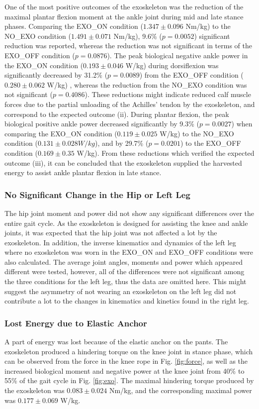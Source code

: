 \documentclass[10pt]{asme2ej}
\begin{document}
One of the most positive outcomes of the exoskeleton was the reduction of the maximal plantar flexion moment at the ankle joint during mid and late stance phases.
Comparing the EXO\_ON condition ($1.347\pm0.096$ Nm/kg) to the NO\_EXO condition ($1.491\pm0.071$ Nm/kg), 9.6\% ($p = 0.0052$) significant reduction was reported, whereas the reduction was not significant in terms of the EXO\_OFF  condition ($p = 0.0876$).
The peak biological negative ankle power in the EXO\_ON condition ($0.193\pm0.046$ W/kg) during dorsiflexion was significantly decreased by 31.2\% ($p = 0.0089$) from the EXO\_OFF condition ($0.280\pm0.062$ W/kg) , whereas the reduction from the NO\_EXO condition was not significant ($p = 0.4086$).
These reductions might indicate reduced calf muscle forces due to the partial unloading of the Achilles’ tendon by the exoskeleton, and correspond to the expected outcome (ii).
During plantar flexion, the peak biological positive ankle power decreased significantly by 9.3\% ($p = 0.0027$) when comparing the EXO\_ON condition ($0.119\pm0.025$ W/kg) to the NO\_EXO condition ($0.131\pm0.028 W/kg$), and by 29.7\% ($p = 0.0201$) to the EXO\_OFF condition ($0.169\pm0.35$ W/kg).
From these reductions which verified the expected outcome (iii), it can be concluded that the exoskeleton supplied the harvested energy to assist ankle plantar flexion in late stance.

\subsubsection{No Significant Change in the Hip or Left Leg}
The hip joint moment and power did not show any significant differences over the entire gait cycle.
As the exoskeleton is designed for assisting the knee and ankle joints, it was expected that the hip joint was not affected a lot by the exoskeleton.
In addition, the inverse kinematics and dynamics of the left leg where no exoskeleton was worn in the EXO\_ON and EXO\_OFF conditions were also calculated.
The average joint angles, moments and power which appeared different were tested, however, all of the differences were not significant among the three conditions for the left leg, thus the data are omitted here.
This might suggest the asymmetry of not wearing an exoskeleton on the left leg did not contribute a lot to the changes in kinematics and kinetics found in the right leg.

\subsubsection{Lost Energy due to Elastic Anchor}
A part of energy was lost because of the elastic anchor on the pants.
The exoskeleton produced a hindering torque on the knee joint in stance phase, which can be observed from the force in the knee rope in Fig. \ref{fig:force}, as well as the increased biological moment and negative power at the knee joint from 40\% to 55\% of the gait cycle in Fig. \ref{fig:exo}. 
The maximal hindering torque produced by the exoskeleton was $0.083\pm0.024$ Nm/kg, and the corresponding maximal power was $0.177\pm0.069$ W/kg.
\end{document}
